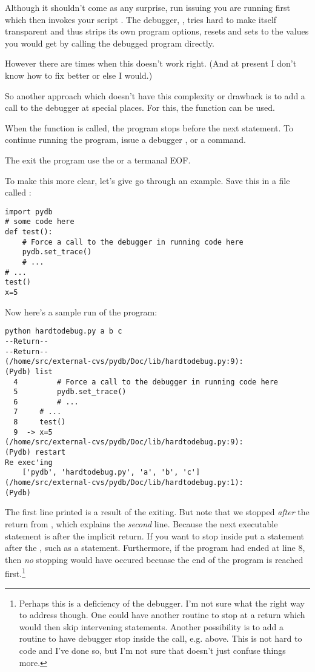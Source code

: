 Although it shouldn't come as any surprise, run issuing  you are running  first which then invokes your
script . The debugger, , tries hard to
make itself transparent and thus strips its own program options,
resets  and sets  to the values you
would get by calling the debugged program directly.

However there are times when this doesn't work right. (And at present
I don't know how to fix better or else I would.)

So another approach which doesn't have this complexity or drawback is
to add a call to the debugger at special places. For this, the
 function  can be used. 

When the  function is called, the program stops
before the next statement. To continue running the program, issue a
debugger ,  or a  command.

The exit the program use the  or a termanal EOF.

To make this more clear, let's give go through an example. Save this
in a file called :

\begin{verbatim}
import pydb
# some code here
def test():
    # Force a call to the debugger in running code here
    pydb.set_trace()
    # ...
# ...
test()
x=5
\end{verbatim}

Now here's a sample run of the program:

\begin{verbatim}
python hardtodebug.py a b c
--Return--
--Return--
(/home/src/external-cvs/pydb/Doc/lib/hardtodebug.py:9):
(Pydb) list
  4         # Force a call to the debugger in running code here
  5         pydb.set_trace()
  6         # ...
  7     # ...
  8     test()
  9  -> x=5
(/home/src/external-cvs/pydb/Doc/lib/hardtodebug.py:9): 
(Pydb) restart
Re exec'ing
	['pydb', 'hardtodebug.py', 'a', 'b', 'c']
(/home/src/external-cvs/pydb/Doc/lib/hardtodebug.py:1): 
(Pydb) 
\end{verbatim}

The first  line printed is a result of the
 exiting. But note that we stopped \emph{after\/} the
return from , which explains the \emph{second\/}
 line. Because the next executable statement is after
the implicit return. If you want to stop inside  put a
statement after the , such as a 
statement. Furthermore, if the program had ended at line 8, then
\emph{no\/} stopping would have occured becuase the end of the program
is reached first.\footnote{Perhaps this is a deficiency of the
debugger. I'm not sure what the right way to address though. One could
have another routine to stop at a return which would then skip
intervening statements. Another possibility is to add a routine to
have debugger stop inside the call, e.g.  above. This
is not hard to code and I've done so, but I'm not sure that doesn't
just confuse things more.}


